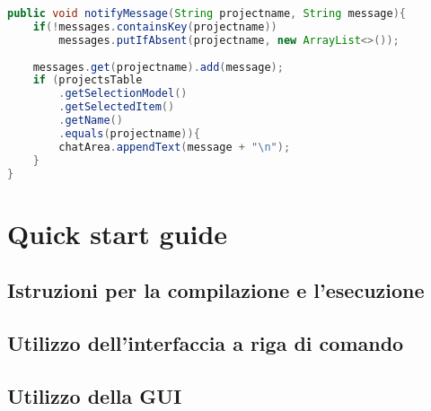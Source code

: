 \documentclass{article}
\begin{document}
\begin{lstlisting}[language=Java, caption=Il metodo \texttt{notifyMessage()}]
public void notifyMessage(String projectname, String message){
    if(!messages.containsKey(projectname)) 
        messages.putIfAbsent(projectname, new ArrayList<>());
        
    messages.get(projectname).add(message);
    if (projectsTable
        .getSelectionModel()
        .getSelectedItem()
        .getName()
        .equals(projectname)){
        chatArea.appendText(message + "\n");
    }
}
\end{lstlisting}

\newpage
\section{Quick start guide}
\subsection{Istruzioni per la compilazione e l'esecuzione}
\subsection{Utilizzo dell'interfaccia a riga di comando}
\subsection{Utilizzo della GUI}
\end{document}
